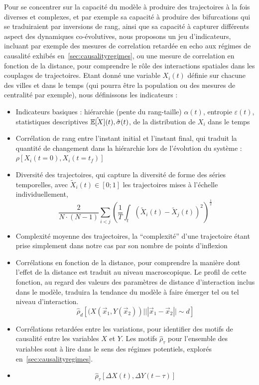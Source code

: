 Pour se concentrer sur la capacité du modèle à produire des trajectoires à la fois diverses et complexes, et par exemple sa capacité à produire des bifurcations qui se traduiraient par inversions de rang, ainsi que sa capacité à capturer différents aspect des dynamiques co-évolutives, nous proposons un jeu d'indicateurs, incluant par exemple des mesures de correlation retardée en echo aux régimes de causalité exhibés en~\ref{sec:causalityregimes}, ou une mesure de correlation en fonction de la distance, pour comprendre le rôle des interactions spatiales dans les couplages de trajectoires. Etant donné une variable $X_i(t)$ définie sur chacune des villes et dans le temps (qui pourra être la population ou des mesures de centralité par exemple), nous définissons les indicateurs :

\begin{itemize}
  \item Indicateurs basiques : hiérarchie (pente du rang-taille) $\alpha (t)$, entropie $\varepsilon (t)$, statistiques descriptives $\hat{\operatorname{\mathbb{E}}\!\left[X\right]} (t), \hat{\sigma} (t)$, de la distribution de $X_i$ dans le temps
  \item Corrélation de rang entre l'instant initial et l'instant final, qui traduit la quantité de changement dans la hiérarchie lors de l'évolution du système : $\rho\left[X_i(t=0),X_i(t=t_f)\right]$
  \item Diversité des trajectoires, qui capture la diversité de forme des séries temporelles, avec $\tilde{X}_i(t)\in \left[0;1\right]$ les trajectoires mises à l'échelle individuellement,
\[
\frac{2}{N\cdot(N-1)}\sum_{i<j} \left(\frac{1}{T}\int_{t} \left(\tilde{X}_i(t) - \tilde{X}_j(t)\right)^2 \right)^{\frac{1}{2}}
\]
\item Complexité moyenne des trajectoires, la ``complexité'' d'une trajectoire étant prise simplement dans notre cas par son nombre de points d'inflexion
\item Corrélations en fonction de la distance, pour comprendre la manière dont l'effet de la distance est traduit au niveau macroscopique. Le profil de cette fonction, au regard des valeurs des paramètres de distance d'interaction inclus dans le modèle, traduira la tendance du modèle à faire émerger tel ou tel niveau d'interaction.
\[
\hat{\rho}_d\left[(X(\vec{x}_1,Y(\vec{x}_2))|||\vec{x}_1-\vec{x}_2||\sim d\right]
\]
\item Corrélations retardées entre les variations, pour identifier des motifs de causalité entre les variables $X$ et $Y$. Les motifs $\hat{\rho}_{\tau}$ pour l'ensemble des variables sont à lire dans le sens des régimes potentiels, explorés en~\ref{sec:causalityregimes}.
\item \[
\hat{\rho}_{\tau}\left[\Delta X(t),\Delta Y(t-\tau)\right]
\]
\end{itemize}

